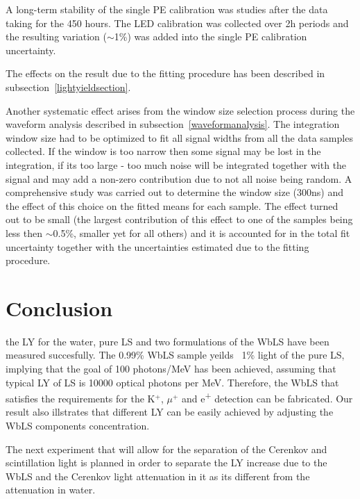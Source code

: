 \documentclass[preprint,12pt]{elsarticle}
\begin{document}
A long-term stability of the single PE calibration was studies after the data taking for the 450 hours. The LED calibration was collected over 2h periods and the resulting variation ($\sim$1\%) was added into the single PE calibration uncertainty.

The effects on the result due to the fitting procedure has been described in subsection~\ref{lightyieldsection}.

Another systematic effect arises from the window size selection process during the waveform analysis described in subsection~\ref{waveformanalysis}. The integration window size had to be optimized to fit all signal widths from all the data samples collected. If the window is too narrow then some signal may be lost in the integration, if its too large - too much noise will be integrated together with the signal and may add a non-zero contribution due to not all noise being random. A comprehensive study was carried out to determine the window size (300ns) and the effect of this choice on the fitted means for each sample. The effect turned out to be small (the largest contribution of this effect to one of the samples being less then $\sim$0.5\%, smaller yet for all others) and it is accounted for in the total fit uncertainty together with the uncertainties estimated due to the fitting procedure.


 \section{Conclusion}
 \label{conclusionsection}

the LY for the water, pure LS and two formulations of the WbLS have been measured succesfully. The 0.99\% WbLS sample yeilds ~1\% light of the pure LS, implying that the goal of 100 photons/MeV has been achieved, assuming that typical LY of LS is 10000 optical photons per MeV. Therefore, the WbLS that satisfies the requirements for the K$^{+}$, $\mu^{+}$ and e\textsuperscript{+} detection can be fabricated. Our result also illstrates that different LY can be easily achieved by adjusting the WbLS components concentration.

The next experiment that will allow for the separation of the Cerenkov and scintillation light is planned in order to separate the LY increase due to the WbLS and the Cerenkov light attenuation in it as its different from the attenuation in water.
\end{document}

